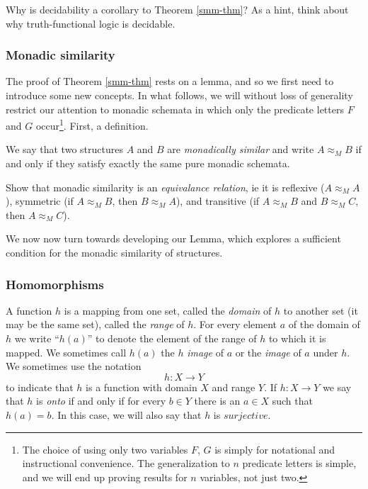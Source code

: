 \begin{aside}
    Why is decidability a corollary to Theorem \ref{smm-thm}? As a hint, think about why truth-functional logic is decidable.
\end{aside}

\subsubsection*{Monadic similarity}
The proof of Theorem \ref{smm-thm} rests on a lemma, and so we first need to introduce some new concepts. In what follows, we will without loss of generality restrict our attention to monadic schemata in which only the predicate letters $F$ and $G$ occur\footnote{The choice of using only two variables $F$, $G$ is simply for notational and instructional convenience. The generalization to $n$ predicate letters is simple, and we will end up proving results for $n$ variables, not just two.}. First, a definition. 

\begin{definition}
    We say that two structures $A$ and $B$ are {\em monadically similar} and write $A \approx_M B$ if and
only if they satisfy exactly the same pure monadic schemata.
\end{definition}

\begin{aside}
    Show that monadic similarity is an \emph{equivalance relation}, ie it is reflexive ($A \approx_M A$), symmetric (if $A \approx_M B$, then $B \approx_M A$), and transitive (if $A \approx_M B$ and $B \approx_M C$, then $A \approx_M C$). 
\end{aside}

We now now turn towards developing our Lemma, which explores a sufficient condition for the monadic similarity of structures.


\subsubsection*{Homomorphisms}

A function $h$ is a mapping from one set, called the {\em domain} of $h$ to
another set (it may be the same set), called the {\em range} of $h.$ For every
element $a$ of the domain of $h$ we write ``$h(a)$'' to denote the element of
the 
range of $h$ to which it is mapped. We sometimes call $h(a)$ the $h$ {\em
image} of 
$a$ or the {\em image} of $a$ under $h.$ We sometimes use the notation
$$h: X \longrightarrow Y$$
to indicate that $h$ is a function with domain $X$ and range $Y.$
If $h: X \longrightarrow Y$ we say that $h$ is {\em onto} if and only if for
every 
$b\in Y$ there is an $a \in X$ such that $h(a)=b.$
In this case, we will also say that $h$ is $surjective.$

